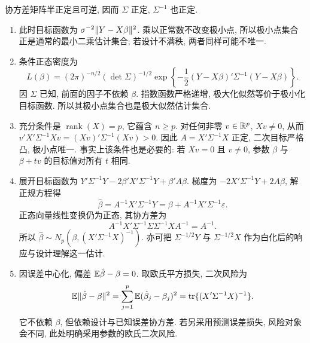 \begin{solution}
协方差矩阵半正定且可逆, 因而 $\Sigma$ 正定, $\Sigma^{-1}$ 也正定.
\begin{enumerate}[label=\arabic*.]
\item 此时目标函数为 $\sigma^{-2}\lVert Y-X\beta\rVert^2$. 乘以正常数不改变极小点, 所以极小点集合正是通常的最小二乘估计集合; 若设计不满秩, 两者同样可能不唯一.
\item 条件正态密度为
\[
L(\beta)=(2\pi)^{-n/2}(\det\Sigma)^{-1/2}
\exp\left\{-\frac12(Y-X\beta)'\Sigma^{-1}(Y-X\beta)\right\}.
\]
因 $\Sigma$ 已知, 前面的因子不依赖 $\beta$. 指数函数严格递增, 极大化似然等价于极小化目标函数. 所以其极小点集合也是极大似然估计集合.
\item 充分条件是 $\operatorname{rank}(X)=p$, 它蕴含 $n\ge p$. 对任何非零 $v\in\mathbb R^p$, $Xv\ne0$, 从而
$v'X'\Sigma^{-1}Xv=(Xv)'\Sigma^{-1}(Xv)>0$.
因此 $A=X'\Sigma^{-1}X$ 正定, 二次目标严格凸, 极小点唯一. 事实上该条件也是必要的: 若 $Xv=0$ 且 $v\ne0$, 参数 $\beta$ 与 $\beta+tv$ 的目标值对所有 $t$ 相同.
\item 展开目标函数为 $Y'\Sigma^{-1}Y-2\beta'X'\Sigma^{-1}Y+\beta'A\beta$. 梯度为 $-2X'\Sigma^{-1}Y+2A\beta$, 解正规方程得
\[
\hat\beta=A^{-1}X'\Sigma^{-1}Y=\beta+A^{-1}X'\Sigma^{-1}\varepsilon.
\]
正态向量线性变换仍为正态, 其协方差为
\[
A^{-1}X'\Sigma^{-1}\Sigma\Sigma^{-1}XA^{-1}=A^{-1}.
\]
所以 $\hat\beta\sim N_p(\beta,(X'\Sigma^{-1}X)^{-1})$. 亦可把 $\Sigma^{-1/2}Y$ 与 $\Sigma^{-1/2}X$ 作为白化后的响应与设计理解这一估计.
\item 因误差中心化, 偏差 $\mathbb E\hat\beta-\beta=0$. 取欧氏平方损失, 二次风险为
\[
\mathbb E\lVert \hat\beta-\beta\rVert^2
=\sum_{j=1}^p\mathbb E(\hat\beta_j-\beta_j)^2
=\operatorname{tr}\{(X'\Sigma^{-1}X)^{-1}\}.
\]
它不依赖 $\beta$, 但依赖设计与已知误差协方差. 若另采用预测误差损失, 风险对象会不同, 此处明确采用参数的欧氏二次风险.
\end{enumerate}
\end{solution}

